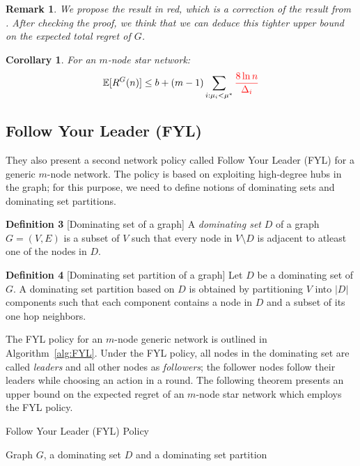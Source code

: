 \documentclass{article}
\newtheorem{corollary}{Corollary}
\newtheorem{remark}{Remark}
\begin{document}
\begin{remark}
  We propose the result in red, which is a correction of the result from \cite{DBLP:journals/corr/KollaJG16}. After checking the proof, we think that we can deduce this tighter upper bound on the expected total regret of $G$.
\end{remark}

\begin{corollary}
  \label{cor:star}
  For an $m$-node star network:
  \begin{equation}
    \mathbb{E}[R^G(n)] \leq b + (m - 1) \sum\limits_{i:\mu_i < \mu^*} {\color{red} \frac{8 \ln n}{\Delta_i}}
  \end{equation}
\end{corollary}

\subsection{Follow Your Leader (FYL)}
They also present a second network policy called Follow Your Leader (FYL) for a generic $m$-node network. The policy is based on exploiting high-degree hubs in the graph; for this purpose, we need to define notions of dominating sets and dominating set partitions.

\textbf{Definition 3} [Dominating set of a graph] A \textit{dominating set} $D$ of a graph $G = (V,E)$ is a subset of $V$ such that every node in $V\setminus D$ is adjacent to atleast one of the nodes in $D$.

\textbf{Definition 4} [Dominating set partition of a graph]
Let $D$ be a dominating set of $G$. A dominating set partition based on $D$ is obtained by partitioning $V$ into $|D|$ components such that each component contains a node in $D$ and a subset of its one hop neighbors.

The FYL policy for an $m$-node generic network is outlined in Algorithm~\ref{alg:FYL}. Under the FYL policy, all nodes in the dominating set are called {\em leaders} and all other nodes as {\em followers}; the follower nodes follow their leaders while choosing an action in a round.
The following theorem presents an upper bound on the expected regret of an $m$-node star network which employs the FYL policy.

\begin{algorithm}[htb]
   \caption{Follow Your Leader (FYL) Policy}
   \label{alg:FYL}
   \begin{algorithmic}
      Graph $G$, a dominating set $D$ and a dominating set partition
  \end{algorithmic}
\end{algorithm}
\end{document}
